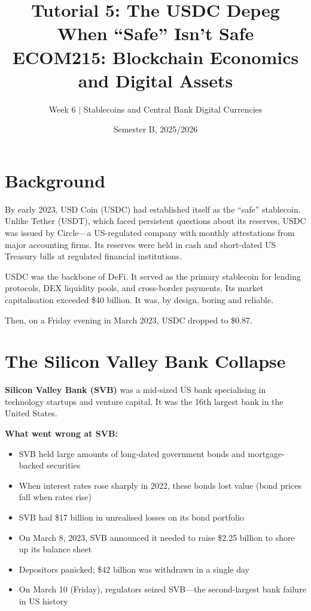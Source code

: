 \documentclass[11pt]{article}
\title{Tutorial 5: The USDC Depeg\\[0.3em] \Large When ``Safe'' Isn't Safe\\[1em] \normalsize ECOM215: Blockchain Economics and Digital Assets}
\author{Week 6 $\vert$ Stablecoins and Central Bank Digital Currencies}
\date{Semester B, 2025/2026}
\begin{document}
\maketitle

\vspace{1em}
\begin{center}
\end{center}

\section*{Background}

By early 2023, USD Coin (USDC) had established itself as the ``safe'' stablecoin. Unlike Tether (USDT), which faced persistent questions about its reserves, USDC was issued by Circle---a US-regulated company with monthly attestations from major accounting firms. Its reserves were held in cash and short-dated US Treasury bills at regulated financial institutions.

USDC was the backbone of DeFi. It served as the primary stablecoin for lending protocols, DEX liquidity pools, and cross-border payments. Its market capitalisation exceeded \$40 billion. It was, by design, boring and reliable.

Then, on a Friday evening in March 2023, USDC dropped to \$0.87.

\section*{The Silicon Valley Bank Collapse}

\textbf{Silicon Valley Bank (SVB)} was a mid-sized US bank specialising in technology startups and venture capital. It was the 16th largest bank in the United States.

\medskip
\noindent\textbf{What went wrong at SVB:}
\begin{itemize}[leftmargin=*]
\item SVB held large amounts of long-dated government bonds and mortgage-backed securities
\item When interest rates rose sharply in 2022, these bonds lost value (bond prices fall when rates rise)
\item SVB had \$17 billion in unrealised losses on its bond portfolio
\item On March 8, 2023, SVB announced it needed to raise \$2.25 billion to shore up its balance sheet
\item Depositors panicked; \$42 billion was withdrawn in a single day
\item On March 10 (Friday), regulators seized SVB---the second-largest bank failure in US history
\end{itemize}
\end{document}
